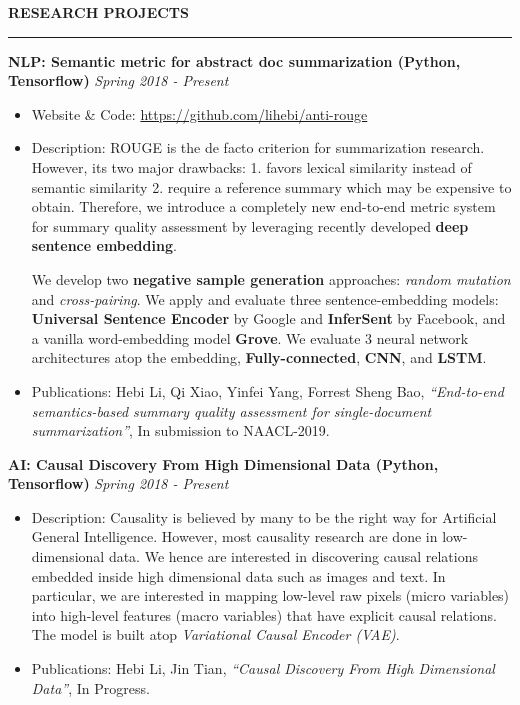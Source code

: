 \documentclass[10pt,letterpaper]{article}
\newenvironment{mysection}[1]{ %
  \medskip
  \MakeUppercase{\bf #1}
  \medskip
  \hrule
  \begin{list}{}{
      \setlength{\leftmargin}{1.5em}
    }
  \item[]
}{
  \end{list}
}
\begin{document}
\begin{mysection}{Research Projects}

  \textbf{NLP: Semantic metric for abstract doc summarization (Python,
    Tensorflow)} \hfill \emph{Spring 2018 - Present}
  \begin{itemize}
  \item Website \& Code: \url{https://github.com/lihebi/anti-rouge}
  \item Description: ROUGE is the de facto criterion for summarization
    research.  However, its two major drawbacks: 1. favors lexical
    similarity instead of semantic similarity 2. require a reference
    summary which may be expensive to obtain.  Therefore, we introduce
    a completely new end-to-end metric system for summary quality
    assessment by leveraging recently developed \textbf{deep sentence
      embedding}.

    We develop two \textbf{negative sample generation} approaches:
    \textit{random mutation} and \textit{cross-pairing}.  We apply and
    evaluate three sentence-embedding models: \textbf{Universal
      Sentence Encoder} by Google and \textbf{InferSent} by Facebook,
    and a vanilla word-embedding model \textbf{Grove}. We evaluate 3
    neural network architectures atop the embedding,
    \textbf{Fully-connected}, \textbf{CNN}, and \textbf{LSTM}.

  \item Publications: Hebi Li, Qi Xiao, Yinfei Yang, Forrest Sheng Bao,
      \textit{``End-to-end semantics-based summary quality assessment
        for single-document summarization''}, In submission to
      NAACL-2019.
  \end{itemize}
  
  \textbf{AI: Causal Discovery From High Dimensional Data (Python,
    Tensorflow)} \hfill \emph{Spring 2018 - Present}

  \begin{itemize}
  \item Description: Causality is believed by many to be the right way
    for Artificial General Intelligence. However, most causality
    research are done in low-dimensional data. We hence are interested
    in discovering causal relations embedded inside high dimensional
    data such as images and text. In particular, we are interested in
    mapping low-level raw pixels (micro variables) into high-level
    features (macro variables) that have explicit causal relations.
    The model is built atop \emph{Variational Causal Encoder (VAE)}.
  \item Publications: Hebi Li, Jin Tian, \textit{``Causal Discovery
    From High Dimensional Data''}, In Progress.
  \end{itemize}
  

\end{mysection}
\end{document}
